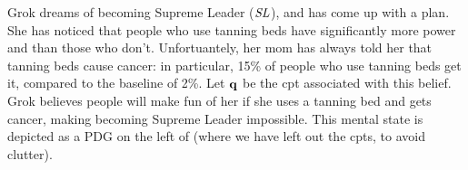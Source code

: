 \documentclass{article}
\numberwithin{equation}{section}
\begin{document}
	\begin{example}\label{ex:grok-union}
		Grok dreams of becoming Supreme Leader ($\it SL$), and
                has come up with a plan. She has noticed that people
                who use tanning beds have significantly more power and
                than those who don't. Unfortuantely, her mom has
                always told her that tanning beds cause cancer: in
                particular, 15\% of people who use tanning beds
                get it, compared to the baseline of 2\%. Let $\mathbf q$ be
                the cpt associated with this belief.  
		Grok believes people will make fun of her if she uses
                a tanning bed and gets cancer, making becoming 
Supreme Leader impossible. This mental state is depicted as  a PDG 
        on the left of  (where we have left out
        the cpts, to avoid clutter).
		
		\begin{figure}
			\centering
\end{figure}
\end{example}
\end{document}
